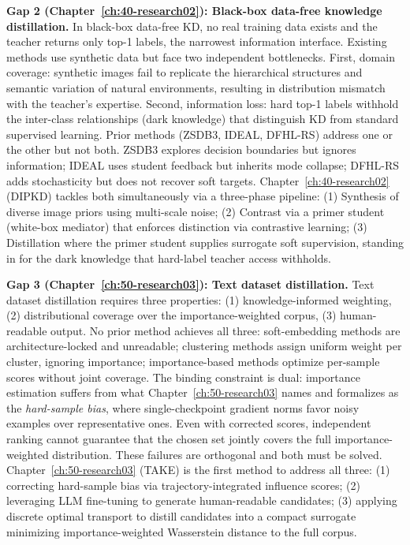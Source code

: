 \begin{foldable}
  \textbf{Gap 2 (Chapter~\ref{ch:40-research02}): Black-box data-free knowledge distillation.}
  In black-box data-free \ac{KD}, no real training data exists and the teacher returns only top-1 labels, the narrowest information interface.
  Existing methods use synthetic data but face two independent bottlenecks.
  First, domain coverage: synthetic images fail to replicate the hierarchical structures and semantic variation of natural environments, resulting in distribution mismatch with the teacher's expertise.
  Second, information loss: hard top-1 labels withhold the inter-class relationships (dark knowledge) that distinguish \ac{KD} from standard supervised learning.
  Prior methods (ZSDB3, IDEAL, DFHL-RS) address one or the other but not both.
  ZSDB3 explores decision boundaries but ignores information; IDEAL uses student feedback but inherits mode collapse; DFHL-RS adds stochasticity but does not recover soft targets.
  Chapter~\ref{ch:40-research02} (\ac{DIPKD}) tackles both simultaneously via a three-phase pipeline: (1) Synthesis of diverse image priors using multi-scale noise; (2) Contrast via a primer student (white-box mediator) that enforces distinction via contrastive learning; (3) Distillation where the primer student supplies surrogate soft supervision, standing in for the dark knowledge that hard-label teacher access withholds.
\end{foldable}

\begin{foldable}
  \textbf{Gap 3 (Chapter~\ref{ch:50-research03}): Text dataset distillation.}
  Text dataset distillation requires three properties: (1) knowledge-informed weighting, (2) distributional coverage over the importance-weighted corpus, (3) human-readable output.
  No prior method achieves all three: soft-embedding methods are architecture-locked and unreadable; clustering methods assign uniform weight per cluster, ignoring importance; importance-based methods optimize per-sample scores without joint coverage.
  The binding constraint is dual: importance estimation suffers from what Chapter~\ref{ch:50-research03} names and formalizes as the \textit{hard-sample bias}, where single-checkpoint gradient norms favor noisy examples over representative ones.
  Even with corrected scores, independent ranking cannot guarantee that the chosen set jointly covers the full importance-weighted distribution.
  These failures are orthogonal and both must be solved.
  Chapter~\ref{ch:50-research03} (TAKE) is the first method to address all three: (1) correcting hard-sample bias via trajectory-integrated influence scores; (2) leveraging \ac{LLM} fine-tuning to generate human-readable candidates; (3) applying discrete optimal transport to distill candidates into a compact surrogate minimizing importance-weighted Wasserstein distance to the full corpus.
\end{foldable}

